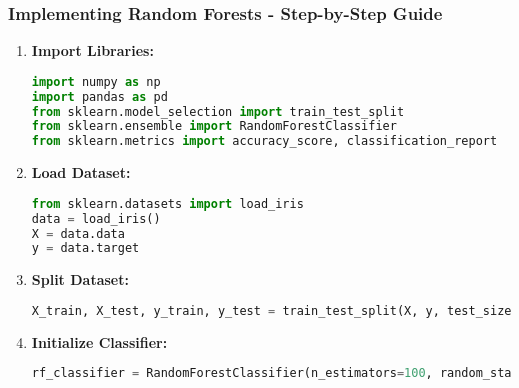 \documentclass[aspectratio=169]{beamer}
\begin{document}
\begin{frame}[fragile]
    \frametitle{Implementing Random Forests - Step-by-Step Guide}
    \begin{enumerate}
        \item \textbf{Import Libraries:}
        \begin{lstlisting}[language=Python]
import numpy as np
import pandas as pd
from sklearn.model_selection import train_test_split
from sklearn.ensemble import RandomForestClassifier
from sklearn.metrics import accuracy_score, classification_report
        \end{lstlisting}
        
        \item \textbf{Load Dataset:}
        \begin{lstlisting}[language=Python]
from sklearn.datasets import load_iris
data = load_iris()
X = data.data
y = data.target
        \end{lstlisting}
        
        \item \textbf{Split Dataset:}
        \begin{lstlisting}[language=Python]
X_train, X_test, y_train, y_test = train_test_split(X, y, test_size=0.2, random_state=42)
        \end{lstlisting}
        
        \item \textbf{Initialize Classifier:}
        \begin{lstlisting}[language=Python]
rf_classifier = RandomForestClassifier(n_estimators=100, random_state=42)
        \end{lstlisting}
    \end{enumerate}
\end{frame}
\end{document}
